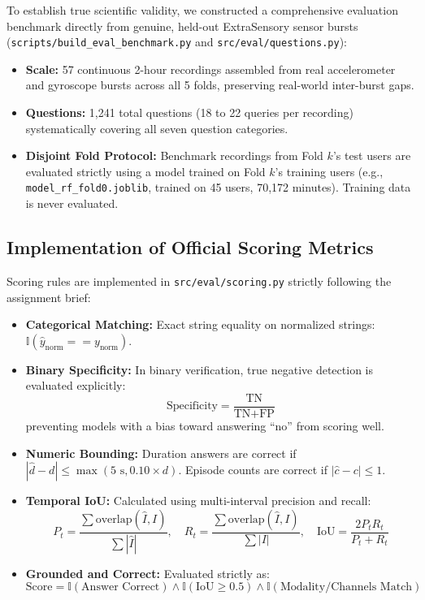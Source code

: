 \documentclass[11pt,a4paper]{article}
\begin{document}
To establish true scientific validity, we constructed a comprehensive evaluation benchmark directly from genuine, held-out ExtraSensory sensor bursts (\texttt{scripts/build\_eval\_benchmark.py} and \texttt{src/eval/questions.py}):
\begin{itemize}[leftmargin=1.5em,noitemsep,topsep=2pt]
  \item \textbf{Scale:} 57 continuous 2-hour recordings assembled from real accelerometer and gyroscope bursts across all 5 folds, preserving real-world inter-burst gaps.
  \item \textbf{Questions:} 1,241 total questions (18 to 22 queries per recording) systematically covering all seven question categories.
  \item \textbf{Disjoint Fold Protocol:} Benchmark recordings from Fold $k$'s test users are evaluated strictly using a model trained on Fold $k$'s training users (e.g., \texttt{model\_rf\_fold0.joblib}, trained on 45 users, 70,172 minutes). Training data is never evaluated.
\end{itemize}

\subsection{Implementation of Official Scoring Metrics}
Scoring rules are implemented in \texttt{src/eval/scoring.py} strictly following the assignment brief:
\begin{itemize}[leftmargin=1.5em,noitemsep,topsep=2pt]
  \item \textbf{Categorical Matching:} Exact string equality on normalized strings: $\mathbb{I}(\hat{y}_{\text{norm}} == y_{\text{norm}})$.
  \item \textbf{Binary Specificity:} In binary verification, true negative detection is evaluated explicitly:
  \begin{equation}
    \text{Specificity} = \frac{\text{TN}}{\text{TN} + \text{FP}}
  \end{equation}
  preventing models with a bias toward answering ``no'' from scoring well.
  \item \textbf{Numeric Bounding:} Duration answers are correct if $|\hat{d} - d| \le \max(5\text{ s}, 0.10 \times d)$. Episode counts are correct if $|\hat{c} - c| \le 1$.
  \item \textbf{Temporal IoU:} Calculated using multi-interval precision and recall:
  \begin{equation}
    P_t = \frac{\sum \text{overlap}(\hat{I}, I)}{\sum |\hat{I}|}, \quad R_t = \frac{\sum \text{overlap}(\hat{I}, I)}{\sum |I|}, \quad \text{IoU} = \frac{2 P_t R_t}{P_t + R_t}
  \end{equation}
  \item \textbf{Grounded and Correct:} Evaluated strictly as:
  \begin{equation}
    \text{Score} = \mathbb{I}(\text{Answer Correct}) \land \mathbb{I}(\text{IoU} \ge 0.5) \land \mathbb{I}(\text{Modality/Channels Match})
  \end{equation}
\end{itemize}
\end{document}
